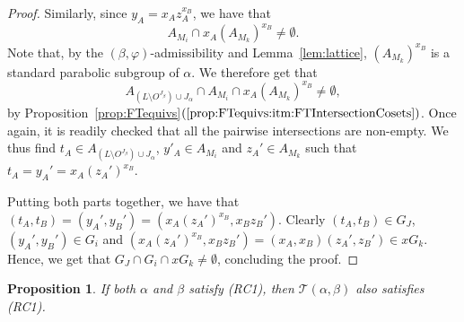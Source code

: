 \documentclass[11pt,letterpaper]{amsart}
\newtheorem{prop}{Proposition}[section]
\newcommand{\TT}{\mathcal{T}}
\begin{document}
\begin{proof}
    Similarly, since $y_A = x_A z_A^{x_B}$, we have that 
    $$A_{M_i}\cap x_A (A_{M_k})^{x_B} \neq \emptyset.$$
    Note that, by the $(\beta,\varphi)$-admissibility and Lemma~\ref{lem:lattice}, $(A_{M_k})^{x_B}$ is a standard parabolic subgroup of $\alpha$.
    We therefore get that
    $$A_{(L\setminus O^{J_\beta}) \cup J_\alpha} \cap A_{M_i}\cap x_A ( A_{M_k} )^{x_B} \neq \emptyset,$$
    by Proposition~\ref{prop:FTequivs}$(\ref{prop:FTequivs:itm:FTIntersectionCosets})$. Once again, it is readily checked that all the pairwise intersections are non-empty.
    We thus find $t_A\in A_{(L\setminus O^{J_\beta}) \cup J_\alpha}$, $y'_A\in A_{M_i}$ and $z_A'\in A_{M_k}$ such that $t_A = y_A' = x_A (z_A')^{x_B}$.

    Putting both parts together, we have that $(t_A,t_B) = (y_A',y_B') = (x_A (z_A')^{x_B}, x_B z_B')$.
    Clearly $(t_A,t_B)\in G_J$, $(y_A',y_B') \in G_i$ and $(x_A (z_A')^{x_B}, x_B z_B') = (x_A,x_B)(z_A',z_B') \in x G_k$.
    Hence, we get that $G_J\cap G_i\cap x G_k\neq \emptyset$, concluding the proof.
\end{proof}

\begin{prop} \label{prop:TwistingRC1}
    If both $\alpha$ and $\beta$ satisfy (RC1), then $\TT(\alpha,\beta)$ also satisfies (RC1).
\end{prop}
\end{document}
